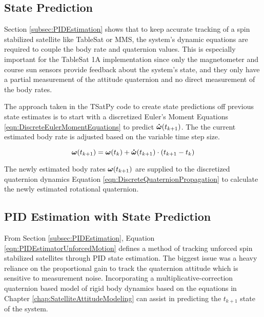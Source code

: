 \subsection{State Prediction}
\label{subsec:StatePrediction}

Section \ref{subsec:PIDEstimation} shows that to keep accurate tracking of a spin stabilized satellite like TableSat or MMS, the system's dynamic equations are required to couple the body rate and quaternion values.  This is especially important for the TableSat 1A implementation since only the magnetometer and course sun sensors provide feedback about the system's state, and they only have a partial measurement of the attitude quaternion and no direct measurement of the body rates.

The approach taken in the TSatPy code to create state predictions off previous state estimates is to start with a discretized Euler's Moment Equations \ref{eqn:DiscreteEulerMomentEquations} to predict $\boldsymbol{\dot{\omega}}(t_{k+1})$.  The the current estimated body rate is adjusted based on the variable time step size.

\begin{equation}
  \boldsymbol{\omega}(t_{k+1}) = \boldsymbol{\omega}(t_{k}) + \boldsymbol{\dot{\omega}}(t_{k+1})\cdot (t_{k+1} - t_k)
\end{equation}

The newly estimated body rates $\boldsymbol{\omega}(t_{k+1})$ are supplied to the discretized quaternion dynamics Equation \ref{eqn:DiscreteQuaternionPropagation} to calculate the newly estimated rotational quaternion.

\subsection{PID Estimation with State Prediction}
\label{subsec:PIDEstimatorwithStatePrediction}

From Section \ref{subsec:PIDEstimation}, Equation \ref{eqn:PIDEstimatorUnforcedMotion} defines a method of tracking unforced spin stabilized satellites through PID state estimation.  The biggest issue was a heavy reliance on the proportional gain to track the quaternion attitude which is sensitive to measurement noise.  Incorporating a multiplicative-correction quaternion based model of rigid body dynamics based on the equations in Chapter \ref{chap:SatelliteAttitudeModeling} can assist in predicting the $t_{k+1}$ state of the system.

